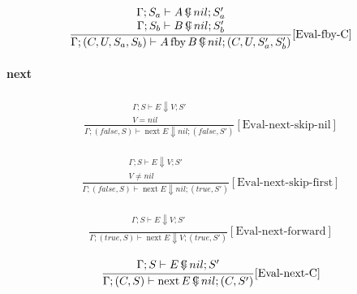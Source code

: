 \documentclass{scrartcl}
\DeclareMathOperator{\fby}{fby}
\DeclareMathOperator{\nextop}{next}
\DeclareMathOperator{\ceval}{\overset{C}{\smash{\Downarrow}}}
\begin{document}
    \begin{align*}
    \frac{
        \begin{matrix}
        \Gamma; S_a \vdash A \ceval nil; S_a' \\
        \Gamma; S_b \vdash B \ceval nil; S_b'
        \end{matrix}
    }{
        \Gamma; (C, U, S_a, S_b) \vdash A \fby B \ceval nil; (C, U, S_a', S_b')
    }[\text{Eval-fby-C}]
    \end{align*}
    
    \paragraph{next}
    
    \begin{align*}
    \frac{
        \begin{matrix}
        \Gamma; S \vdash E \Downarrow V; S' \\
        V = nil
        \end{matrix}
    }{
        \Gamma; (false, S) \vdash \nextop E \Downarrow nil; (false, S')
    }[\text{Eval-next-skip-nil}]
    \end{align*}
    
    \begin{align*}
    \frac{
        \begin{matrix}
        \Gamma; S \vdash E \Downarrow V; S' \\
        V \neq nil
        \end{matrix}
    }{
        \Gamma; (false, S) \vdash \nextop E \Downarrow nil; (true, S')
    }[\text{Eval-next-skip-first}]
    \end{align*}
    
    \begin{align*}
    \frac{
        \begin{matrix}
        \Gamma; S \vdash E \Downarrow V; S' \\
        \end{matrix}
    }{
        \Gamma; (true, S) \vdash \nextop E \Downarrow V; (true, S')
    }[\text{Eval-next-forward}]
    \end{align*}
    
    \begin{align*}
    \frac{
        \begin{matrix}
        \Gamma; S \vdash E \ceval nil; S' \\
        \end{matrix}
    }{
        \Gamma; (C, S) \vdash \nextop E \ceval nil; (C, S')
    }[\text{Eval-next-C}]
    \end{align*}
    
\end{document}
